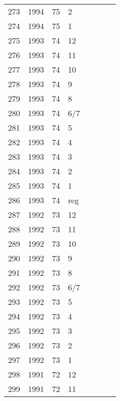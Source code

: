 \begin{longtable}{ |l|l|l|l|l|l|l|l| }
273 & 1994 & 75 &     2 &         &                &  & \\
274 & 1994 & 75 &     1 &         &                &  & \\
275 & 1993 & 74 &    12 &         &                &  & \\
276 & 1993 & 74 &    11 &         &                &  & \\
277 & 1993 & 74 &    10 &         &                &  & \\
278 & 1993 & 74 &     9 &         &                &  & \\
279 & 1993 & 74 &     8 &         &                &  & \\
280 & 1993 & 74 &   6/7 &         &                &  & \\
281 & 1993 & 74 &     5 &         &                &  & \\
282 & 1993 & 74 &     4 &         &                &  & \\
283 & 1993 & 74 &     3 &         &                &  & \\
284 & 1993 & 74 &     2 &         &                &  & \\
285 & 1993 & 74 &     1 &         &                &  & \\
286 & 1993 & 74 &   reg &         &                &  & \\
287 & 1992 & 73 &    12 &         &                &  & \\
288 & 1992 & 73 &    11 &         &                &  & \\
289 & 1992 & 73 &    10 &         &                &  & \\
290 & 1992 & 73 &     9 &         &                &  & \\
291 & 1992 & 73 &     8 &         &                &  & \\
292 & 1992 & 73 &   6/7 &         &                &  & \\
293 & 1992 & 73 &     5 &         &                &  & \\
294 & 1992 & 73 &     4 &         &                &  & \\
295 & 1992 & 73 &     3 &         &                &  & \\
296 & 1992 & 73 &     2 &         &                &  & \\
297 & 1992 & 73 &     1 &         &                &  & \\
298 & 1991 & 72 &    12 &         &                &  & \\
299 & 1991 & 72 &    11 &         &                &  & \\

\end{longtable}
